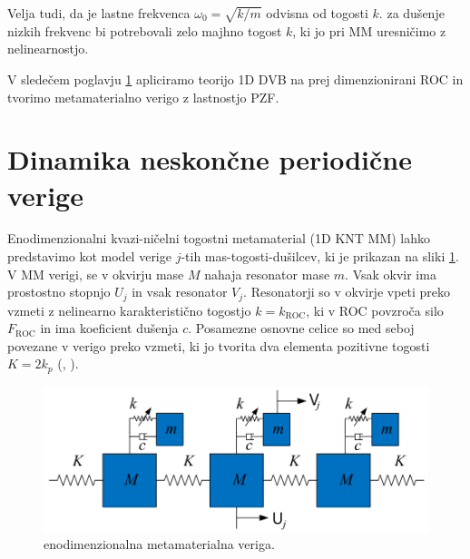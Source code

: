         Velja tudi, da je lastne frekvenca $\omega_0=\sqrt{k/m}$ odvisna od togosti $k$. za dušenje nizkih frekvenc bi potrebovali zelo majhno togost $k$, ki jo pri MM uresničimo z nelinearnostjo. 
        
        V sledečem poglavju \ref{sec:metamaterial_dinamika} apliciramo teorijo 1D DVB na prej dimenzionirani ROC in tvorimo metamaterialno verigo z lastnostjo PZF. 
    
    \newpage
    \section{Dinamika neskončne periodične verige}\label{sec:metamaterial_dinamika}
        
        Enodimenzionalni kvazi-ničelni togostni metamaterial (1D KNT MM) lahko predstavimo kot model verige $j$-tih mas-togosti-dušilcev, ki je prikazan na sliki \ref{fig:MM_veriga}. V MM verigi, se v okvirju mase $M$ nahaja resonator mase $m$. Vsak okvir ima prostostno stopnjo $U_j$ in vsak resonator $V_j$. Resonatorji so v okvirje vpeti preko vzmeti z nelinearno karakteristično togostjo $k=k_{\mathrm{ROC}}$, ki v ROC povzroča silo $F_{\mathrm{ROC}}$ in ima koeficient dušenja $c$. Posamezne osnovne celice so med seboj povezane v verigo preko vzmeti, ki jo tvorita dva elementa pozitivne togosti $K=2 k_p$ (\cite{cai2020design}, \cite{lazarov2007low} ). 
        \begin{figure}[!hb]
            \centering
            \includegraphics[scale=0.42]{slike/teorija/MM_veriga.png}
            \caption{enodimenzionalna metamaterialna veriga.}\label{fig:MM_veriga}
        \end{figure}
        

